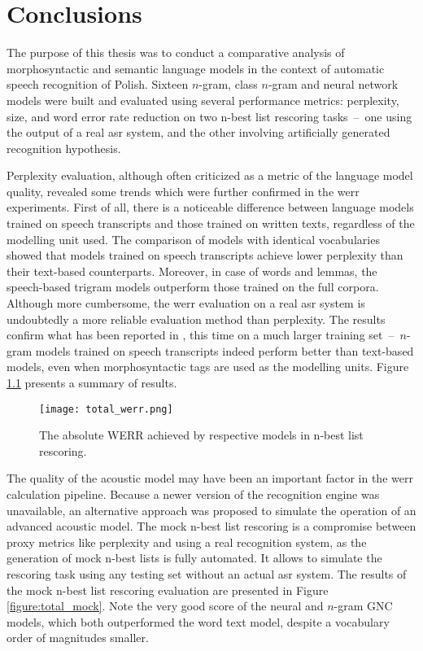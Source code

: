 \chapter{Conclusions}
\label{chapter:conclusion}
The purpose of this thesis was to conduct a comparative analysis of morphosyntactic and semantic language models in the context of automatic speech recognition of Polish. Sixteen \mbox{$n$-gram,} class \mbox{$n$-gram} and neural network models were built and evaluated using several performance metrics: perplexity, size, and word error rate reduction on two n-best list rescoring tasks~--~one using the output of a real \gls{asr} system, and the other involving artificially generated recognition hypothesis.

Perplexity evaluation, although often criticized as a metric of the language model quality, revealed some trends which were further confirmed in the \gls{werr} experiments. First of all, there is a noticeable difference between language models trained on speech transcripts and those trained on written texts, regardless of the modelling unit used. The comparison of models with identical vocabularies showed that models trained on speech transcripts achieve lower perplexity than their text-based counterparts. Moreover, in case of words and lemmas, the speech-based trigram models outperform those trained on the full corpora.
Although more cumbersome, the \gls{werr} evaluation on a real \gls{asr} system is undoubtedly a more reliable evaluation method than perplexity. The results confirm what has been reported in \cite{dziadzio2015comparison}, this time on a much larger training set~--~\mbox{$n$-gram} models trained on speech transcripts indeed perform better than text-based models, even when morphosyntactic tags are used as the modelling units. Figure \ref{figure:total} presents a summary of results.

\begin{figure}[!htbp]
	  \centering
	  \texttt{[image: total\_werr.png]}
	  \caption[Absolute WERR achieved in n-best list rescoring]{The absolute WERR achieved by respective models in n-best list rescoring.}
	      \label{figure:total}
\end{figure}

The quality of the acoustic model may have been an important factor in the \gls{werr} calculation pipeline. Because a newer version of the recognition engine was unavailable, an alternative approach was proposed to simulate the operation of an advanced acoustic model. The mock n-best list rescoring is a compromise between proxy metrics like perplexity and using a real recognition system, as the generation of mock n-best lists is fully automated. It allows to simulate the rescoring task using any testing set without an actual \gls{asr} system. The results of the mock n-best list rescoring evaluation are presented in Figure \ref{figure:total_mock}. Note the very good score of the neural and \mbox{$n$-gram} GNC models, which both outperformed the word text model, despite a vocabulary order of magnitudes smaller.

